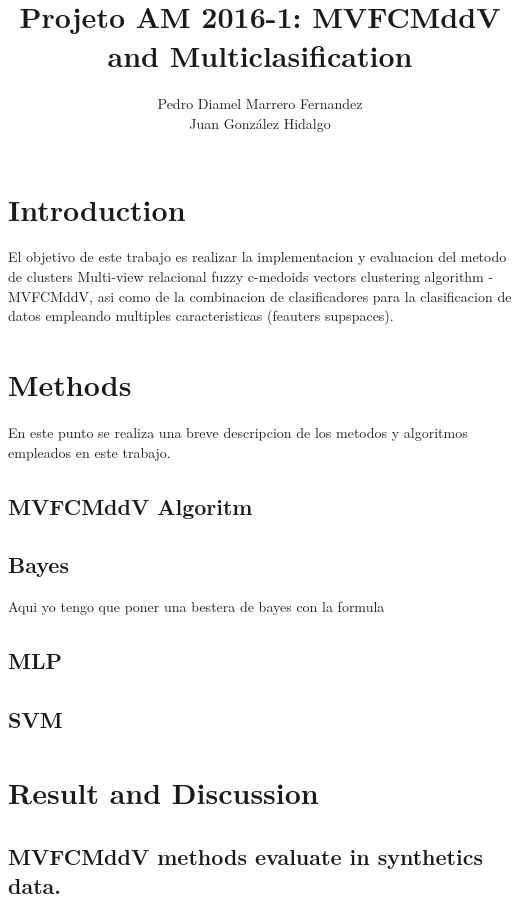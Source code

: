 \documentclass[12pt]{article}
\author{Pedro Diamel Marrero Fernandez \\ Juan González Hidalgo}
\title{Projeto AM 2016-1: MVFCMddV and Multiclasification}
\begin{document}
\maketitle



\section*{Introduction}

El objetivo de este trabajo es realizar la implementacion y evaluacion del metodo de clusters Multi-view relacional fuzzy c-medoids vectors clustering algorithm - MVFCMddV, asi como de la combinacion de clasificadores para la clasificacion de datos empleando multiples caracteristicas (feauters supspaces).  

\section{Methods}
En este punto se realiza una breve descripcion de los metodos y algoritmos empleados en este trabajo.

\subsection{MVFCMddV Algoritm}

\subsection{Bayes}
Aqui yo tengo que poner una bestera de bayes con la formula 

\subsection{MLP}

\subsection{SVM}



\section{Result and Discussion }


\subsection{MVFCMddV methods evaluate in synthetics data.}
\end{document}
